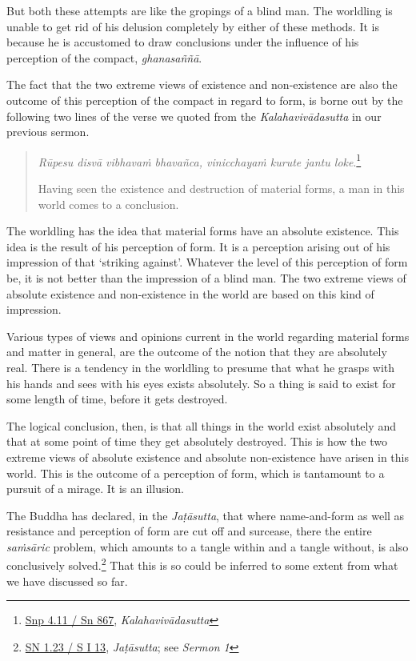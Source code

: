 But both these attempts are like the gropings of a blind man. The worldling is unable to get rid of his delusion completely by either of these methods. It is because he is accustomed to draw conclusions under the influence of his perception of the compact, \emph{ghanasaññā}.

The fact that the two extreme views of existence and non-existence are also the outcome of this perception of the compact in regard to form, is borne out by the following two lines of the verse we quoted from the \emph{Kalahavivādasutta} in our previous sermon.

\begin{quote}
\emph{Rūpesu disvā vibhavaṁ bhavañca, vinicchayaṁ kurute jantu loke}.\footnote{\href{https://suttacentral.net/snp4.11/pli/ms}{Snp 4.11 / Sn 867}, \emph{Kalahavivādasutta}}

Having seen the existence and destruction of material forms, a man in this world comes to a conclusion.
\end{quote}

The worldling has the idea that material forms have an absolute existence. This idea is the result of his perception of form. It is a perception arising out of his impression of that `striking against'. Whatever the level of this perception of form be, it is not better than the impression of a blind man. The two extreme views of absolute existence and non-existence in the world are based on this kind of impression.

Various types of views and opinions current in the world regarding material forms and matter in general, are the outcome of the notion that they are absolutely real. There is a tendency in the worldling to presume that what he grasps with his hands and sees with his eyes exists absolutely. So a thing is said to exist for some length of time, before it gets destroyed.

The logical conclusion, then, is that all things in the world exist absolutely and that at some point of time they get absolutely destroyed. This is how the two extreme views of absolute existence and absolute non-existence have arisen in this world. This is the outcome of a perception of form, which is tantamount to a pursuit of a mirage. It is an illusion.

The Buddha has declared, in the \emph{Jaṭāsutta}, that where name-and-form as well as resistance and perception of form are cut off and surcease, there the entire \emph{saṁsāric} problem, which amounts to a tangle within and a tangle without, is also conclusively solved.\footnote{\href{https://suttacentral.net/sn1.23/pli/ms}{SN 1.23 / S I 13}, \emph{Jaṭāsutta}; see \emph{Sermon 1}} That this is so could be inferred to some extent from what we have discussed so far.


